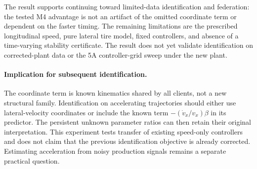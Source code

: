 The result supports continuing toward limited-data identification and
federation: the tested M4 advantage is not an artifact of the omitted
coordinate term or dependent on the faster timing. The remaining limitations
are the prescribed longitudinal speed, pure lateral tire model, fixed
controllers, and absence of a time-varying stability certificate. The result
does not yet validate identification on corrected-plant data or the 5A
controller-grid sweep under the new plant.

\paragraph{Implication for subsequent identification.}
The coordinate term is known kinematics shared by all clients, not a new
structural family. Identification on accelerating trajectories should either
use lateral-velocity coordinates or include the known term
$-(\dot v_x/v_x)\beta$ in its predictor. The persistent unknown parameter ratios
can then retain their original interpretation. This experiment tests transfer
of existing speed-only controllers and does not claim that the previous
identification objective is already corrected. Estimating acceleration from
noisy production signals remains a separate practical question.
